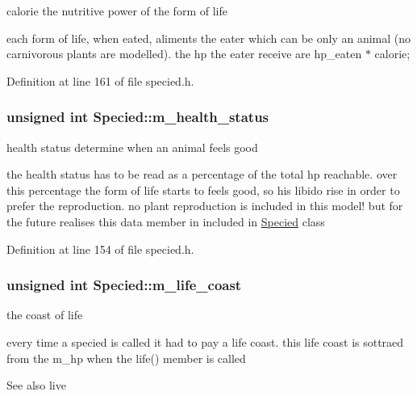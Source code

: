 calorie the nutritive power of the form of life 

each form of life, when eated, aliments the eater which can be only an animal (no carnivorous plants are modelled). the hp the eater receive are hp\_\-eaten $\ast$ calorie; 

Definition at line 161 of file specied.h.

\hypertarget{classSpecied_a7d716a70352c40bbe1ff3bd8c5719f29}{
\subsubsection[{m\_\-health\_\-status}]{\setlength{\rightskip}{0pt plus 5cm}unsigned int {\bf Specied::m\_\-health\_\-status}}}
\label{classSpecied_a7d716a70352c40bbe1ff3bd8c5719f29}


health status determine when an animal feels good 

the health status has to be read as a percentage of the total hp reachable. over this percentage the form of life starts to feels good, so his libido rise in order to prefer the reproduction. no plant reproduction is included in this model! but for the future realises this data member in included in \hyperlink{classSpecied}{Specied} class 

Definition at line 154 of file specied.h.

\hypertarget{classSpecied_acbfa5daa32bfb761a44f9d6e0763762e}{
\subsubsection[{m\_\-life\_\-coast}]{\setlength{\rightskip}{0pt plus 5cm}unsigned int {\bf Specied::m\_\-life\_\-coast}}}
\label{classSpecied_acbfa5daa32bfb761a44f9d6e0763762e}


the coast of life 

every time a specied is called it had to pay a life coast. this life coast is sottraed from the m\_\-hp when the life() member is called \begin{DoxySeeAlso}{See also}
live 
\end{DoxySeeAlso}


